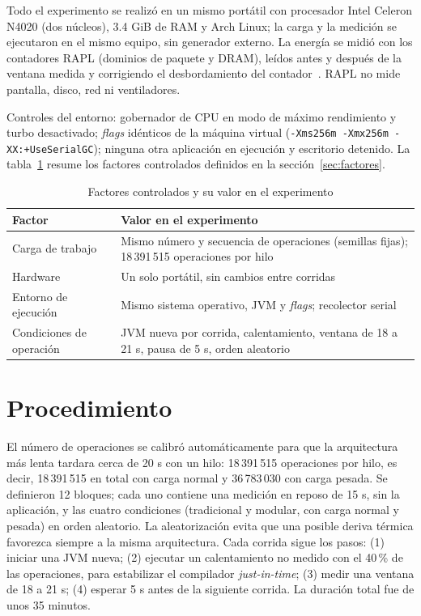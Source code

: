 Todo el experimento se realizó en un mismo portátil con procesador Intel Celeron N4020 (dos núcleos), 3.4 GiB de RAM y Arch Linux; la carga y la medición se ejecutaron en el mismo equipo, sin generador externo. La energía se midió con los contadores RAPL (dominios de paquete y DRAM), leídos antes y después de la ventana medida y corrigiendo el desbordamiento del contador~\cite{khan2018rapl}. RAPL no mide pantalla, disco, red ni ventiladores.

Controles del entorno: gobernador de CPU en modo de máximo rendimiento y turbo desactivado; \textit{flags} idénticos de la máquina virtual (\texttt{-Xms256m -Xmx256m -XX:+UseSerialGC}); ninguna otra aplicación en ejecución y escritorio detenido. La tabla~\ref{tab:controlados} resume los factores controlados definidos en la sección~\ref{sec:factores}.

\begin{table}[htbp]
\centering
\caption{Factores controlados y su valor en el experimento}
\label{tab:controlados}
\small
{}
\setlength{\parskip}{0pt}
\begin{tabular}{@{}p{3.6cm}p{10.6cm}@{}}
\toprule
\textbf{Factor} & \textbf{Valor en el experimento} \\
\midrule
Carga de trabajo & Mismo número y secuencia de operaciones (semillas fijas); 18\,391\,515 operaciones por hilo \\[3pt]
Hardware & Un solo portátil, sin cambios entre corridas \\[3pt]
Entorno de ejecución & Mismo sistema operativo, JVM y \textit{flags}; recolector serial \\[3pt]
Condiciones de operación & JVM nueva por corrida, calentamiento, ventana de 18 a 21 s, pausa de 5 s, orden aleatorio \\
\bottomrule
\end{tabular}
\end{table}

\section{Procedimiento}

El número de operaciones se calibró automáticamente para que la arquitectura más lenta tardara cerca de 20 s con un hilo: 18\,391\,515 operaciones por hilo, es decir, 18\,391\,515 en total con carga normal y 36\,783\,030 con carga pesada. Se definieron 12 bloques; cada uno contiene una medición en reposo de 15 s, sin la aplicación, y las cuatro condiciones (tradicional y modular, con carga normal y pesada) en orden aleatorio. La aleatorización evita que una posible deriva térmica favorezca siempre a la misma arquitectura. Cada corrida sigue los pasos: (1) iniciar una JVM nueva; (2) ejecutar un calentamiento no medido con el 40\,\% de las operaciones, para estabilizar el compilador \textit{just-in-time}; (3) medir una ventana de 18 a 21 s; (4) esperar 5 s antes de la siguiente corrida. La duración total fue de unos 35 minutos.

